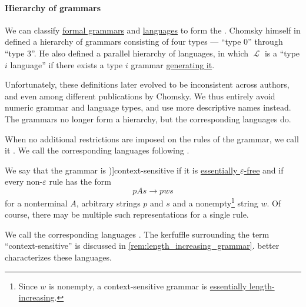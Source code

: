 \paragraph{Hierarchy of grammars}

\begin{definition}\label{def:chomsky_hierarchy}
  We can classify \hyperref[def:formal_grammar]{formal grammars} and \hyperref[def:formal_language]{languages} to form the . Chomsky himself in \cite[def. 6]{Chomsky1959Grammars} defined a hierarchy of grammars consisting of four types --- \enquote{type 0} through \enquote{type 3}. He also defined a parallel hierarchy of languages, in which \( \mscrL \) is a \enquote{type \( i \) language} if there exists a type \( i \) grammar \hyperref[def:formal_grammar/language]{generating it}.

  Unfortunately, these definitions later evolved to be inconsistent across authors, and even among different publications by Chomsky. We thus entirely avoid numeric grammar and language types, and use more descriptive names instead. The grammars no longer form a hierarchy, but the corresponding languages do.

  \begin{thmenum}
     When no additional restrictions are imposed on the rules of the grammar, we call it . We call the corresponding languages  following \cite[thm 5.4.1; thm 5.4.2]{Savage2008ModelsOfComputation}.

     We say that the grammar is \term[ru=грамматика составляющих (\cite[29]{Гладкий1973ГрамматикиИЯзыки})]{context-sensitive} if it is \hyperref[def:epsilon_free_grammar]{essentially \( \varepsilon \)-free} and if every non-\( \varepsilon \) rule has the form
    \begin{equation*}
      p A s \to p w s
    \end{equation*}
    for a nonterminal \( A \), arbitrary strings \( p \) and \( s \) and a nonempty\footnote{Since \( w \) is nonempty, a context-sensitive grammar is \hyperref[def:length_increasing_grammar]{essentially length-increasing}.} string \( w \). Of course, there may be multiple such representations for a single rule.

    We call the corresponding languages . The kerfuffle surrounding the term \enquote{context-sensitive} is discussed in \cref{rem:length_increasing_grammar}.  better characterizes these languages.


\end{thmenum}
\end{definition}
